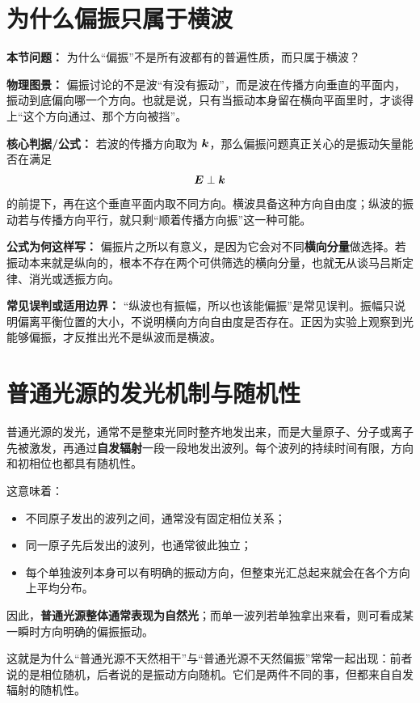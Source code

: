\documentclass[lang=cn,11pt]{elegantbook}
\begin{document}
\section{为什么偏振只属于横波}

\textbf{本节问题：} 为什么“偏振”不是所有波都有的普遍性质，而只属于横波？

\textbf{物理图景：} 偏振讨论的不是波“有没有振动”，而是波在传播方向垂直的平面内，振动到底偏向哪一个方向。也就是说，只有当振动本身留在横向平面里时，才谈得上“这个方向通过、那个方向被挡”。

\textbf{核心判据/公式：} 若波的传播方向取为 \(\vb*{k}\)，那么偏振问题真正关心的是振动矢量能否在满足
\[
\vb*{E}\perp \vb*{k}
\]
的前提下，再在这个垂直平面内取不同方向。横波具备这种方向自由度；纵波的振动若与传播方向平行，就只剩“顺着传播方向振”这一种可能。

\textbf{公式为何这样写：} 偏振片之所以有意义，是因为它会对不同\textbf{横向分量}做选择。若振动本来就是纵向的，根本不存在两个可供筛选的横向分量，也就无从谈马吕斯定律、消光或透振方向。

\textbf{常见误判或适用边界：} “纵波也有振幅，所以也该能偏振”是常见误判。振幅只说明偏离平衡位置的大小，不说明横向方向自由度是否存在。正因为实验上观察到光能够偏振，才反推出光不是纵波而是横波。

\section{普通光源的发光机制与随机性}

普通光源的发光，通常不是整束光同时整齐地发出来，而是大量原子、分子或离子先被激发，再通过\textbf{自发辐射}一段一段地发出波列。每个波列的持续时间有限，方向和初相位也都具有随机性。

这意味着：
\begin{itemize}
  \item 不同原子发出的波列之间，通常没有固定相位关系；
  \item 同一原子先后发出的波列，也通常彼此独立；
  \item 每个单独波列本身可以有明确的振动方向，但整束光汇总起来就会在各个方向上平均分布。
\end{itemize}

因此，\textbf{普通光源整体通常表现为自然光}；而单一波列若单独拿出来看，则可看成某一瞬时方向明确的偏振振动。

\begin{remark}
这就是为什么“普通光源不天然相干”与“普通光源不天然偏振”常常一起出现：前者说的是相位随机，后者说的是振动方向随机。它们是两件不同的事，但都来自自发辐射的随机性。
\end{remark}
\end{document}
